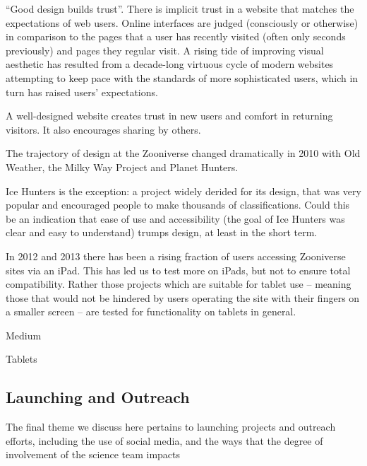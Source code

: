 \documentclass{sigchi}
\begin{document}
``Good design builds trust''. There is implicit trust in a website that matches the expectations of web users. Online interfaces are judged (consciously or otherwise) in comparison to the pages that a user has recently visited (often only seconds previously) and pages they regular visit. A rising tide of improving visual aesthetic has resulted from a decade-long virtuous cycle of modern websites attempting to keep pace with the standards of more sophisticated users, which in turn has raised users' expectations.

A well-designed website creates trust in new users and comfort in returning visitors. It also encourages sharing by others.

The trajectory of design at the Zooniverse changed dramatically in 2010 with Old Weather, the Milky Way Project and Planet Hunters. %

Ice Hunters is the exception: a project widely derided for its design, that was very popular and encouraged people to make thousands of classifications. Could this be an indication that ease of use and accessibility (the goal of Ice Hunters was clear and easy to understand) trumps design, at least in the short term.

In 2012 and 2013 there has been a rising fraction of users accessing Zooniverse sites via an iPad. This has led us to test more on iPads, but not to ensure total compatibility. Rather those projects which are suitable for tablet use -- meaning those that would not be hindered by users operating the site with their fingers on a smaller screen -- are tested for functionality on tablets in general.


Medium

Tablets 

\subsection{Launching and Outreach}

The final theme we discuss here pertains to launching projects and outreach efforts, including the use of social media, and the ways that the degree of involvement of the science team impacts 
\end{document}
